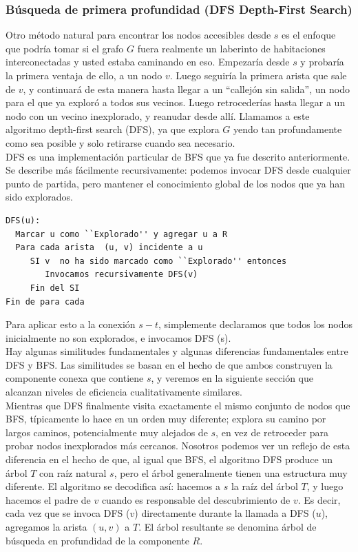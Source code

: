 \documentclass[a4paper, 12pt]{book}
\theoremstyle{dotless}
\begin{document}
\subsubsection*{Búsqueda de primera profundidad (DFS Depth-First Search) }  

Otro método natural para encontrar los nodos accesibles desde $s$ es el enfoque que
podría tomar si el grafo $G$ fuera realmente un laberinto de habitaciones interconectadas y usted estaba caminando en eso. Empezaría desde $s$ y probaría la primera ventaja de ello, a un nodo $v$. Luego seguiría la primera arista que sale de $v$, y continuará de esta manera hasta llegar a un ``callejón sin salida'', un nodo para el que ya exploró a todos sus vecinos. Luego retrocederías hasta llegar a un nodo con un vecino inexplorado, y reanudar desde allí. Llamamos a este algoritmo depth-first search (DFS), ya que explora $G$ yendo tan profundamente como sea posible y solo retirarse cuando sea necesario. \\

DFS es una implementación particular de BFS que ya fue descrito anteriormente. Se describe más fácilmente recursivamente: podemos invocar DFS desde cualquier punto de partida, pero mantener el conocimiento global de los nodos que ya han sido explorados. \\


\begin{lstlisting}
DFS(u):
  Marcar u como ``Explorado'' y agregar u a R
  Para cada arista  (u, v) incidente a u
     SI v  no ha sido marcado como ``Explorado'' entonces
        Invocamos recursivamente DFS(v)
     Fin del SI
Fin de para cada
\end{lstlisting}

Para aplicar esto a la conexión $s-t$, simplemente declaramos que todos los nodos inicialmente no son explorados, e invocamos DFS (s).\\

Hay algunas similitudes fundamentales y algunas diferencias fundamentales entre DFS y BFS. Las similitudes se basan en el hecho de que ambos construyen la componente conexa que contiene $s$, y veremos en la siguiente sección que alcanzan niveles de eficiencia cualitativamente similares.\\

Mientras que DFS finalmente visita exactamente el mismo conjunto de nodos que BFS, típicamente lo hace en un orden muy diferente; explora su camino por largos caminos, potencialmente muy alejados de $s$, en vez de retroceder para probar nodos inexplorados más cercanos. Nosotros podemos ver un reflejo de esta diferencia en el hecho de que, al igual que BFS, el algoritmo DFS produce un árbol $T$ con raíz natural $s$, pero el árbol generalmente tienen una estructura muy diferente. El algoritmo se decodifica así: hacemos a $s$ la raíz del árbol $T$, y luego hacemos el padre de $v$ cuando es responsable del descubrimiento de $v$. Es decir, cada vez que se invoca DFS ($v$) directamente durante la llamada a DFS ($u$), agregamos la arista $(u, v)$ a $T$. El árbol resultante se denomina árbol de búsqueda en profundidad de la componente $R$.\\
\end{document}
